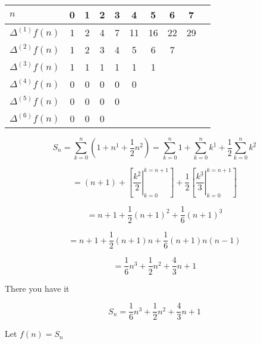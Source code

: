 \documentclass[10pt, AMS Euler]{article}
\newcommand{\ds}{\displaystyle}
\begin{document}
            \begin{center}
                \begin{tabular}{l|ccccccccc}
                    {\bf $n$ } & 0 & 1 & 2 & 3 & 4 & 5 & 6 & 7 \\
                    \hline
                    {$\Delta^{(1)} f(n)$} & 1 & 2 & 4 & 7 & 11 & 16 & 22 & 29 \\
                    {$\Delta^{(2)} f(n)$} & 1 & 2 & 3 & 4 & 5 & 6 & 7    \\
                    {$\Delta^{(3)} f(n)$} & 1 & 1 & 1 & 1 & 1 & 1    \\
                    {$\Delta^{(4)} f(n)$} & 0 & 0 & 0 & 0 & 0     \\
                    {$\Delta^{(5)} f(n)$} & 0 & 0 & 0 & 0     \\
                    {$\Delta^{(6)} f(n)$} & 0 & 0 & 0     \\
                \end{tabular}
            \end{center}

            $$ S_n = \sum_{k=0}^n (1 + n^{\underline{1}} + \frac{1}{2}n^{\underline{2}}) = \sum_{k=0}^n 1 + \sum_{k=0}^n k^{\underline{1}} + \frac{1}{2} \sum_{k=0}^n k^{\underline{2}}$$
            
            $$=(n+1) + [\ds\left .\frac{k^{\underline{2}}}{2}\right|_{k=0}^{k=n+1}] + \frac{1}{2} [\ds\left .\frac{k^{\underline{3}}}{3}\right|_{k=0}^{k=n+1}] $$

            $$= n+1 + \frac{1}{2}(n+1)^{\underline{2}} + \frac{1}{6}(n+1)^{\underline{3}}$$

            $$= n+1 +\frac{1}{2}(n+1)n + \frac{1}{6}(n+1)n(n-1) $$

            $$= \frac{1}{6}n^3 + \frac{1}{2}n^2 + \frac{4}{3}n + 1$$
            
            There you have it
            
            $$ S_n = \frac{1}{6}n^3 + \frac{1}{2}n^2 + \frac{4}{3}n + 1 $$
            
            Let $f(n) = S_n$
\end{document}
